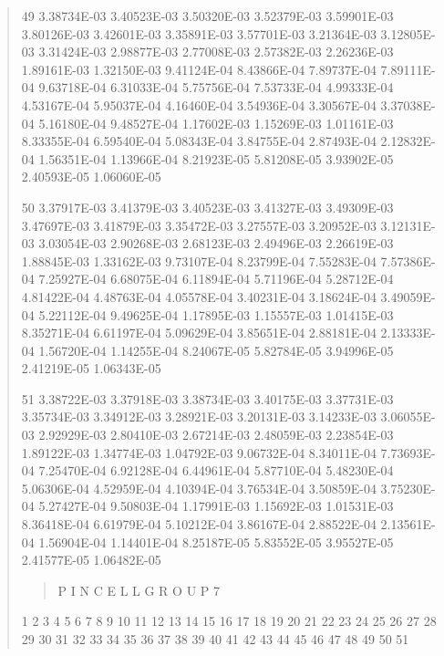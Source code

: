 \documentclass[letterpaper,10pt,english]{sphinxmanual}
\begin{document}
\begin{quote}
\begin{DUlineblock}{0em}
\item[] 49   3.38734E-03  3.40523E-03  3.50320E-03  3.52379E-03  3.59901E-03  3.80126E-03  3.42601E-03  3.35891E-03  3.57701E-03  3.21364E-03  3.12805E-03  3.31424E-03  2.98877E-03  2.77008E-03  2.57382E-03  2.26236E-03  1.89161E-03  1.32150E-03  9.41124E-04  8.43866E-04  7.89737E-04  7.89111E-04  9.63718E-04  6.31033E-04  5.75756E-04  7.53733E-04  4.99333E-04  4.53167E-04  5.95037E-04  4.16460E-04  3.54936E-04  3.30567E-04  3.37038E-04  5.16180E-04  9.48527E-04  1.17602E-03  1.15269E-03  1.01161E-03  8.33355E-04  6.59540E-04  5.08343E-04  3.84755E-04  2.87493E-04  2.12832E-04  1.56351E-04  1.13966E-04  8.21923E-05  5.81208E-05  3.93902E-05  2.40593E-05  1.06060E-05
\item[] 50   3.37917E-03  3.41379E-03  3.40523E-03  3.41327E-03  3.49309E-03  3.47697E-03  3.41879E-03  3.35472E-03  3.27557E-03  3.20952E-03  3.12131E-03  3.03054E-03  2.90268E-03  2.68123E-03  2.49496E-03  2.26619E-03  1.88845E-03  1.33162E-03  9.73107E-04  8.23799E-04  7.55283E-04  7.57386E-04  7.25927E-04  6.68075E-04  6.11894E-04  5.71196E-04  5.28712E-04  4.81422E-04  4.48763E-04  4.05578E-04  3.40231E-04  3.18624E-04  3.49059E-04  5.22112E-04  9.49625E-04  1.17895E-03  1.15557E-03  1.01415E-03  8.35271E-04  6.61197E-04  5.09629E-04  3.85651E-04  2.88181E-04  2.13333E-04  1.56720E-04  1.14255E-04  8.24067E-05  5.82784E-05  3.94996E-05  2.41219E-05  1.06343E-05
\item[] 51   3.38722E-03  3.37918E-03  3.38734E-03  3.40175E-03  3.37731E-03  3.35734E-03  3.34912E-03  3.28921E-03  3.20131E-03  3.14233E-03  3.06055E-03  2.92929E-03  2.80410E-03  2.67214E-03  2.48059E-03  2.23854E-03  1.89122E-03  1.34774E-03  1.04792E-03  9.06732E-04  8.34011E-04  7.73693E-04  7.25470E-04  6.92128E-04  6.44961E-04  5.87710E-04  5.48230E-04  5.06306E-04  4.52959E-04  4.10394E-04  3.76534E-04  3.50859E-04  3.75230E-04  5.27427E-04  9.50803E-04  1.17991E-03  1.15692E-03  1.01531E-03  8.36418E-04  6.61979E-04  5.10212E-04  3.86167E-04  2.88522E-04  2.13561E-04  1.56904E-04  1.14401E-04  8.25187E-05  5.83552E-05  3.95527E-05  2.41577E-05  1.06482E-05
\end{DUlineblock}
\begin{quote}

P I N  C E L L       G R O U P 7
\end{quote}

\begin{DUlineblock}{0em}
\item[] 1        2        3        4        5        6        7        8        9           10           11           12           13           14           15           16           17           18           19           20           21           22           23           24           25           26           27           28           29           30           31           32           33           34           35           36           37           38           39           40           41           42           43           44           45           46           47           48           49           50           51
\end{DUlineblock}


\end{quote}
\end{document}
